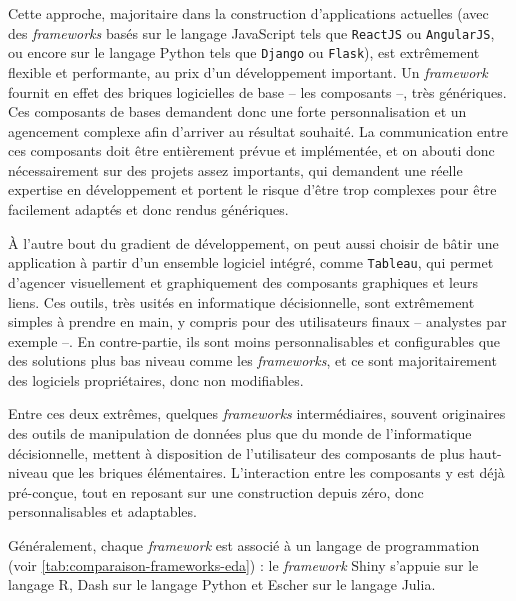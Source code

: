 Cette approche, majoritaire dans la construction d'applications actuelles (avec des \textit{frameworks} basés sur le langage JavaScript tels que \texttt{ReactJS} ou \texttt{AngularJS}, ou encore sur le langage Python tels  que \texttt{Django} ou \texttt{Flask}), est extrêmement flexible et performante, au prix d'un développement important.
Un \textit{framework} fournit en effet des \og briques\fg{} logicielles de base -- les composants --, très génériques.
Ces composants de bases demandent donc une forte personnalisation et un agencement complexe afin d'arriver au résultat souhaité.
La communication entre ces composants doit être entièrement prévue et implémentée, et on abouti donc nécessairement sur des projets assez importants, qui demandent une réelle expertise en développement et portent le risque d'être trop complexes pour être facilement adaptés et donc rendus génériques.

À l'autre bout du gradient de développement, on peut aussi choisir de bâtir une application à partir d'un ensemble logiciel intégré, comme \texttt{Tableau}, qui permet d'agencer visuellement et graphiquement des composants graphiques et leurs liens.
Ces outils, très usités en informatique décisionnelle, sont extrêmement simples à prendre en main, y compris pour des \og utilisateurs finaux\fg{} -- analystes par exemple --.
En contre-partie, ils sont moins personnalisables et configurables que des solutions plus bas niveau comme les \textit{frameworks}, et ce sont majoritairement des logiciels propriétaires, donc non modifiables.

Entre ces deux extrêmes, quelques \textit{frameworks} intermédiaires, souvent originaires des outils de manipulation de données plus que du monde de l'informatique décisionnelle, mettent à disposition de l'utilisateur des composants de plus haut-niveau que les \og briques élémentaires\fg{}.
L'interaction entre les composants y est déjà pré-conçue, tout en reposant sur une construction \og depuis zéro\fg{}, donc personnalisables et adaptables.

Généralement, chaque \textit{framework} est associé à un langage de programmation (voir \cref{tab:comparaison-frameworks-eda}) : le \textit{framework} \textsf{Shiny} s'appuie sur le langage \textsf{R}, \textsf{Dash} sur le langage \textsf{Python} et \textsf{Escher} sur le langage \textsf{Julia}.

